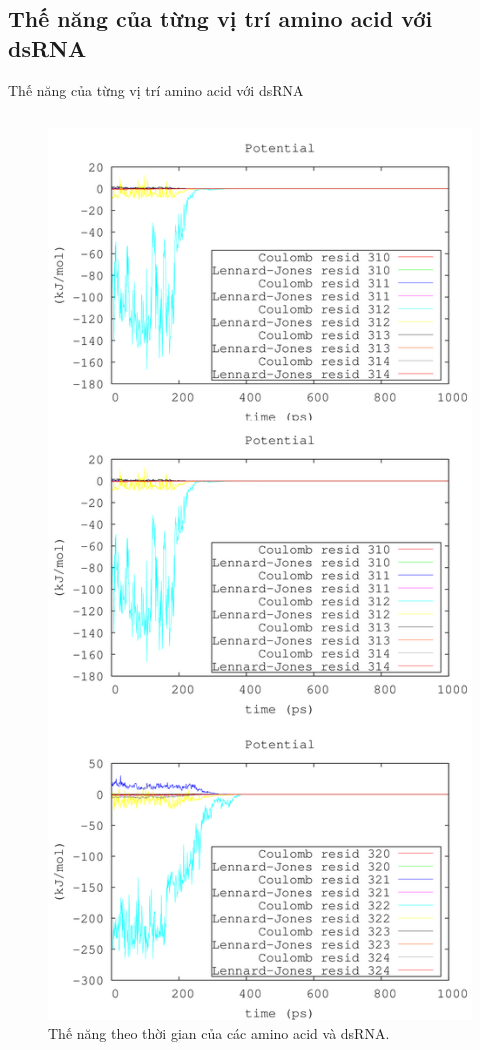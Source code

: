 \documentclass[10pt]{beamer}
\begin{document}
\subsection{Thế năng của từng vị trí amino acid với dsRNA}
	\begin{frame}{Thế năng của từng vị trí amino acid với dsRNA}
		\label{fig:potential}
	\begin{columns}
	\begin{column}{0.4\textwidth}
		\begin{figure}[h]
		\centering
		\includegraphics[height=0.7\textheight,natwidth=610,natheight=642]{potential}
		\caption{Thế năng theo thời gian của các amino acid và dsRNA.}
		\end{figure}
	\end{column}
	

\end{columns}
\end{frame}
\end{document}
